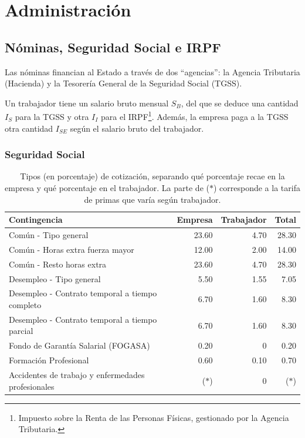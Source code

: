 \documentclass[nochap,palatino,shortheader]{apuntes}
\newcommand{\study}[1]{#1} \newcommand{\substudy}[1]{#1}
\begin{document}
\section{Administración}

\subsection{Nóminas, Seguridad Social e IRPF}

Las nóminas financian al Estado a través de dos ``agencias'': la Agencia Tributaria (Hacienda) y la Tesorería General de la Seguridad Social (TGSS).

Un trabajador tiene un salario bruto mensual $S_B$, del que se deduce una cantidad $I_S$ para la TGSS y otra $I_I$ para el IRPF\footnote{Impuesto sobre la Renta de las Personas Físicas, gestionado por la Agencia Tributaria.}. Además, la empresa paga a la TGSS otra cantidad $I_{SE}$ según el salario bruto del trabajador.

\subsubsection{Seguridad Social}

\begin{table}[hbtp]
\centering
\footnotesize
\begin{tabular}{l|r|r|r}
\textbf{Contingencia} & \textbf{Empresa} & \textbf{Trabajador} & \textbf{Total} \\ \toprule
Común - Tipo general & 23.60 & 4.70 & 28.30 \\
Común - Horas extra fuerza mayor & 12.00 & 2.00 & 14.00 \\
Común - Resto horas extra & 23.60 & 4.70 & 28.30 \\ \midrule
Desempleo - Tipo general & 5.50 & 1.55 & 7.05 \\
Desempleo - Contrato temporal a tiempo completo & 6.70 & 1.60 & 8.30 \\
Desempleo - Contrato temporal a tiempo parcial & 6.70 & 1.60 & 8.30 \\ \midrule
Fondo de Garantía Salarial (FOGASA) & 0.20 & 0 & 0.20 \\ \midrule
Formación Profesional & 0.60 & 0.10 & 0.70 \\ \midrule
Accidentes de trabajo y enfermedades profesionales & ($\ast$) & 0 & ($\ast$) \\ \midrule
\end{tabular}
\caption{\study{Tipos} (en porcentaje) \study{de cotización}, separando qué porcentaje recae en la empresa y qué porcentaje en el trabajador. La parte de ($\ast$) corresponde a la tarifa de primas que varía según trabajador.}
\label{tab:TiposSegSocial}
\end{table}
\end{document}
